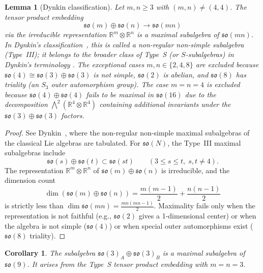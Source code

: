 \documentclass[12pt,a4paper]{article}
\newtheorem{lemma}[theorem]{Lemma}
\newtheorem{corollary}[theorem]{Corollary}
\begin{document}
\begin{lemma}[Dynkin classification]
\label{lemma:dynkin}
Let $m,n \ge 3$ with $(m,n) \neq (4,4)$. The tensor product embedding
\[
\mathfrak{so}(m) \oplus \mathfrak{so}(n) \to \mathfrak{so}(mn)
\]
via the irreducible representation $\mathbb{R}^m \otimes \mathbb{R}^n$
is a maximal subalgebra of $\mathfrak{so}(mn)$. In Dynkin's
classification~\cite{dynkin1952}, this is called a \emph{non-regular
non-simple} subalgebra (Type~III); it belongs to the broader class of
Type~S (or $S$-subalgebras) in Dynkin's terminology
\cite{dynkin1952,bocharov2016improved}.
The exceptional cases $m,n \in \{2,4,8\}$ are excluded because
$\mathfrak{so}(4) \cong \mathfrak{so}(3)\oplus\mathfrak{so}(3)$ is not
simple, $\mathfrak{so}(2)$ is abelian, and $\mathfrak{so}(8)$ has triality
(an $S_3$ outer automorphism group). The case $m=n=4$ is excluded because
$\mathfrak{so}(4)\oplus\mathfrak{so}(4)$ fails to be maximal in
$\mathfrak{so}(16)$ due to the decomposition
$\bigwedge^2(\mathbb{R}^4\otimes\mathbb{R}^4)$ containing additional
invariants under the $\mathfrak{so}(3)\oplus\mathfrak{so}(3)$ factors.
\end{lemma}

\begin{proof}
See Dynkin~\cite[\S15, no.~46, Type~III table (p.~114)]{dynkin1952},
where the non-regular non-simple maximal subalgebras of the classical Lie
algebras are tabulated. For $\mathfrak{so}(N)$, the Type~III maximal
subalgebras include
\[
\mathfrak{so}(s) \oplus \mathfrak{so}(t) \subset \mathfrak{so}(st)
\qquad(3 \le s \le t,\; s,t \neq 4).
\]
The representation $\mathbb{R}^m \otimes \mathbb{R}^n$ of
$\mathfrak{so}(m)\oplus\mathfrak{so}(n)$ is irreducible, and the
dimension count
\[
\dim(\mathfrak{so}(m)\oplus\mathfrak{so}(n)) = \frac{m(m-1)}{2} +
\frac{n(n-1)}{2}
\]
is strictly less than $\dim\mathfrak{so}(mn) = \frac{mn(mn-1)}{2}$.
Maximality fails only when the representation is not faithful (e.g.,
$\mathfrak{so}(2)$ gives a 1-dimensional center) or when the algebra is
not simple ($\mathfrak{so}(4)$) or when special outer automorphisms
exist ($\mathfrak{so}(8)$ triality).
\end{proof}

\begin{corollary}
\label{cor:so3so3max}
The subalgebra $\mathfrak{so}(3)_A \oplus \mathfrak{so}(3)_B$ is a maximal
subalgebra of $\mathfrak{so}(9)$. It arises from the Type~S tensor product
embedding with $m=n=3$.
\end{corollary}
\end{document}
